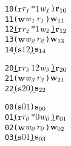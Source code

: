 \newsavebox{\boxtwo}
\begin{lrbox}{\boxtwo}
\begin{minipage}[t]{0.65\linewidth}
\large
\begin{alltt}
10 (\(\mathbf{r}\) \(\mathit{r\sb{1}}\) \(\mathit{\ast 1}\) \(\mathit{w\sb{1}}\)) \(\mathbf{r}\sb{10}\)
11 (\(\mathbf{w}\) \(\mathit{w\sb{1}}\) \(\mathit{r\sb{1}}\)) \(\mathbf{w}\sb{11}\)
12 \underline{(\(\mathbf{r}\) \(\mathit{r\sb{2}}\) \(\mathit{\ast 1}\) \(\mathit{w\sb{2}}\)) \(\mathbf{r}\sb{12}\)}
13 (\(\mathbf{w}\) \(\mathit{w\sb{2}}\) \(\mathit{r\sb{2}}\)) \(\mathbf{w}\sb{13}\)
14 \underline{(\(\mathbf{s}\) \(\mathit{1 2}\)) \(\mathbf{s}\sb{14}\)}
\end{alltt}
\end{minipage}
\end{lrbox}

\newsavebox{\boxthree}
\begin{lrbox}{\boxthree}
\begin{minipage}[t]{0.65\linewidth}
\large
\begin{alltt}
20 \underline{(\(\mathbf{r}\) \(\mathit{r\sb{3}}\) \(\mathit{1 2}\) \(\mathit{w\sb{3}}\)) \(\mathbf{r}\sb{20}\)}
21 (\(\mathbf{w}\) \(\mathit{w\sb{3}}\) \(\mathit{r\sb{3}}\)) \(\mathbf{w}\sb{21}\)
22 \underline{(\(\mathbf{s}\) \(\mathit{2 0}\)) \(\mathbf{s}\sb{22}\)}
\end{alltt}
\end{minipage}
\end{lrbox}


\newcommand\examplefigthree{
\begin{figure*}[tb]
\begin{center}
\setlength{\tabcolsep}{2pt}
\begin{tabular}[t]{c|c|c}
$p_0$ & $p_1$ & $p_2$ \\
\hline
\scalebox{0.8}{\usebox{\boxone}}&
\scalebox{0.8}{\usebox{\boxtwo}} &
\scalebox{0.8}{\usebox{\boxthree}}\\
\end{tabular}
\end{center}
\caption{A Deadlock Caused by Circular Dependency in Messages}
\label{fig:deadlock2}
\end{figure*}
}


\newsavebox{\boxoneno}
\begin{lrbox}{\boxoneno}
\begin{minipage}[t]{0.65\linewidth}
\large
\begin{alltt}
00 (\(\mathbf{s}\) \(\mathit{0 1}\)) \(\mathbf{s}\sb{00}\)
01 \underline{(\(\mathbf{r}\) \(\mathit{r\sb{0}}\) \(\mathit{\ast 0}\) \(\mathit{w\sb{0}}\)) \(\mathbf{r}\sb{01}\)}
02 (\(\mathbf{w}\) \(\mathit{w\sb{0}}\) \(\mathit{r\sb{0}}\)) \(\mathbf{w}\sb{02}\)
03 \underline{(\(\mathbf{s}\) \(\mathit{0 1}\)) \(\mathbf{s}\sb{03}\)}
\end{alltt}
\end{minipage}
\end{lrbox}

